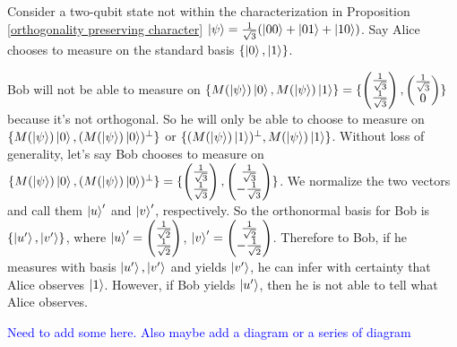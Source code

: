 \begin{example}
Consider a two-qubit state not within the characterization in Proposition \ref{orthogonality preserving character} $\ket{\psi}=\frac{1}{\sqrt{3}}(\ket{00}+\ket{01}+\ket{10})$. Say Alice chooses to measure on the standard basis $\{\ket{0}, \ket{1}\}$.
\end{example}
Bob will not be able to measure on $\{M(\ket{\psi})\ket{0}, M(\ket{\psi})\ket{1}\}=\{\begin{pmatrix}
\frac{1}{\sqrt{3}}\\
\frac{1}{\sqrt{3}}
\end{pmatrix},\begin{pmatrix}
\frac{1}{\sqrt{3}}\\
0
\end{pmatrix}\}$ because it's not orthogonal. So he will only be able to choose to measure on $\{M(\ket{\psi})\ket{0}, (M(\ket{\psi})\ket{0})^\perp \}$ or $\{(M(\ket{\psi})\ket{1})^\perp, M(\ket{\psi})\ket{1} \}$.
Without loss of generality, let's say Bob chooses to measure on $\{M(\ket{\psi})\ket{0}, (M(\ket{\psi})\ket{0})^\perp \}=\{\begin{pmatrix}
\frac{1}{\sqrt{3}}\\
\frac{1}{\sqrt{3}}
\end{pmatrix}, \begin{pmatrix}
\frac{1}{\sqrt{3}}\\
-\frac{1}{\sqrt{3}}
\end{pmatrix}\}$.
We normalize the two vectors and call them $\ket{u}'$ and $\ket{v}'$, respectively. So the orthonormal basis for Bob is $\{\ket{u'}, \ket{v'}\}$, where $\ket{u}'=\begin{pmatrix}
\frac{1}{\sqrt{2}}\\
\frac{1}{\sqrt{2}}
\end{pmatrix}$, $\ket{v}'=\begin{pmatrix}
\frac{1}{\sqrt{2}}\\
-\frac{1}{\sqrt{2}}
\end{pmatrix}$. Therefore to Bob, if he measures with basis $\ket{u'}, \ket{v'}$ and yields $\ket{v'}$, he can infer with certainty that Alice observes $\ket{1}$. However, if Bob yields $\ket{u'}$, then he is not able to tell what Alice observes.

\pagebreak

\textcolor{blue}{Need to add some here.  Also maybe add a diagram or a series of diagram}

